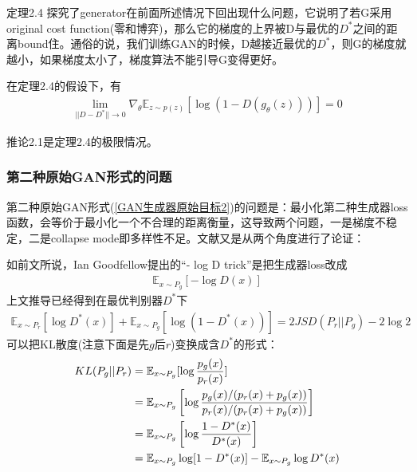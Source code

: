             \par
            定理2.4 探究了generator在前面所述情况下回出现什么问题，它说明了若G采用original cost function(零和博弈)，那么它的梯度的上界被D与最优的$D^*$之间的距离bound住。通俗的说，我们训练GAN的时候，D越接近最优的$D^*$，则G的梯度就越小，如果梯度太小了，梯度算法不能引导G变得更好。
            \begin{corollary}[corollary 2.1]
            在定理2.4的假设下，有
            \begin{align*}
            \lim_{||D-D^*||\to 0}\nabla_\theta \mathbb{E}_{z\sim p(z)}[\log (1-D(g_\theta(z)))]=0
            \end{align*}
            \end{corollary}
            推论2.1是定理2.4的极限情况。
        \subsubsection{第二种原始GAN形式的问题}
            \par
            第二种原始GAN形式(\ref{GAN生成器原始目标2})的问题是：最小化第二种生成器loss函数，会等价于最小化一个不合理的距离衡量，这导致两个问题，一是梯度不稳定，二是collapse mode即多样性不足。文献\cite{2017.Arjovsky}又是从两个角度进行了论证：
            \par
            如前文所说，Ian Goodfellow提出的“- log D trick”是把生成器loss改成
            \begin{align}
            \label{公式3}
            \mathbb{E}_{x\sim P_g}[-\log D(x)]
            \end{align}
            上文推导已经得到在最优判别器$D^*$下
            \begin{align}
            \label{公式9}
            \mathbb{E}_{x\sim P_r}[\log D^*(x)] + \mathbb{E}_{x\sim P_g}[\log(1-D^*(x))] = 2JSD(P_r || P_g) - 2\log 2
            \end{align}
            可以把KL散度(注意下面是先$g$后$r$)变换成含$D^*$的形式：
            \begin{align}
            \label{公式10}
            KL(P_g || P_r) &= \mathbb{E}_{x \sim P_g} [\log \frac{p_g(x)}{p_r(x)}] \notag\\
            &= \mathbb{E}_{x \sim P_g} \left[\log \frac{p_g(x) / (p_r(x) + p_g(x))}{p_r(x) / (p_r(x) + p_g(x))}\right] \notag\\
            &= \mathbb{E}_{x \sim P_g} \left[\log \frac{1 - D^*(x)}{D^*(x)}\right] \notag\\
            &= \mathbb{E}_{x \sim P_g} \log [1 - D^*(x)] - \mathbb{E}_{x \sim P_g} \log D^*(x)
            \end{align}
